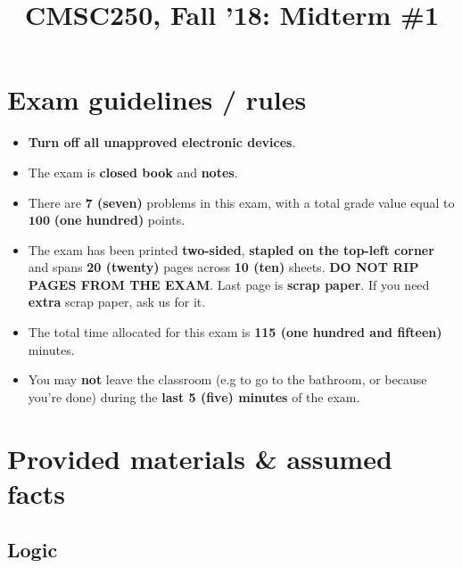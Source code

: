\documentclass[letterpaper,12pt]{article}
\title{CMSC250, Fall '18: Midterm \#1}
\begin{document}

\vspace{-.3in}

\section*{Exam guidelines / rules} 

\label{sec:guidelines}
\begin{itemize}
	\item \textbf{Turn off all unapproved electronic devices}.
	\item The exam is {\bf closed book} and {\bf notes}.
	\item There are \textbf{7 (seven)}  problems in this exam, with a total grade value equal to $\mathbf{100}$ \textbf{(one hundred)} points.
	\item The exam  has been printed \textbf{two-sided}, \textbf{stapled on the top-left corner} and spans \textbf{20 (twenty)} pages across \textbf{10 (ten)} sheets. {\bf DO NOT RIP PAGES FROM THE EXAM}. Last page is {\bf scrap paper}. If you need \textbf{extra} scrap paper, ask us for it.
	\item The total time allocated for this exam is \textbf{115 (one hundred and fifteen)} minutes.
	\item You may \textbf{not} leave the classroom (e.g to go to the bathroom, or because you're done) during the \textbf{last 5 (five) minutes} of the exam.
\end{itemize}

\section*{Provided materials \& assumed facts}
\label{sec:materials}

\subsection*{Logic}
\label{subsec:logic}
\end{document}
